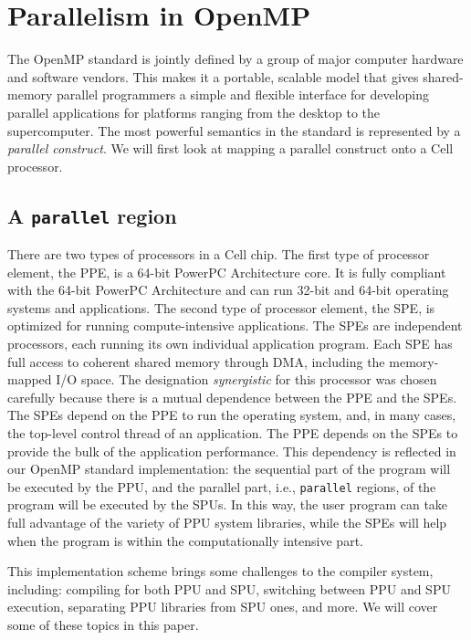 \section{Parallelism in OpenMP}

The OpenMP standard is jointly defined by a group of major computer hardware
and software vendors\cite{Ope05}. This makes it a portable, scalable model that
gives shared-memory parallel programmers a simple and flexible interface for
developing parallel applications for platforms ranging from the desktop to the
supercomputer. The most powerful semantics in the standard is represented by a
\emph{parallel construct}. We will first look at mapping a parallel
construct onto a Cell processor.


\subsection{A \texttt{parallel} region}

There are two types of processors in a Cell chip. The first type of processor
element, the PPE, is a 64-bit PowerPC Architecture core. It is fully compliant
with the 64-bit PowerPC Architecture and can run 32-bit and 64-bit operating
systems and applications. The second type of processor element, the SPE, is
optimized for running compute-intensive applications.  The SPEs are independent
processors, each running its own individual application program. Each SPE has
full access to coherent shared memory through DMA, including the memory-mapped
I/O space. The designation \emph{synergistic} for this processor was chosen
carefully because there is a mutual dependence between the PPE and the SPEs.
The SPEs depend on the PPE to run the operating system, and, in many cases, the
top-level control thread of an application. The PPE depends on the SPEs to
provide the bulk of the application performance. This dependency is reflected
in our OpenMP standard implementation: the sequential part of the program will
be executed by the PPU, and the parallel part, i.e., \texttt{parallel} regions,
of the program will be executed by the SPUs.  In this way, the user program can
take full advantage of the variety of PPU system libraries, while the SPEs will
help when the program is within the computationally intensive part.

This implementation scheme brings some challenges to the compiler
system, including: compiling for both PPU and SPU, switching between 
PPU and SPU execution, separating PPU libraries from SPU ones, and more.
We will cover some of these topics in this paper.

